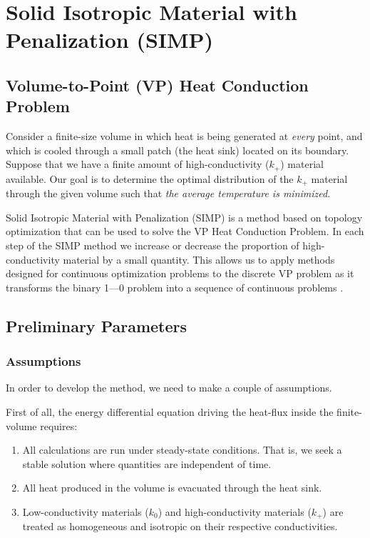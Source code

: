 \section{Solid Isotropic Material with Penalization (SIMP)}

\subsection*{Volume-to-Point (VP) Heat Conduction Problem}

Consider a finite-size volume in which heat is being generated at \textit{every} point, and which is cooled through a small patch (the heat sink) located on its boundary. Suppose that we have a finite amount of high-conductivity ($k_+$) material available. Our goal is to determine the optimal distribution of the $k_+$ material through the given volume such that \textit{the average temperature is minimized}.

Solid Isotropic Material with Penalization (SIMP) is a method based on topology optimization that can be used to solve the VP Heat Conduction Problem. In each step of the SIMP method we increase or decrease the proportion of high-conductivity material by a small quantity. This allows us to apply methods designed for continuous optimization problems to the discrete VP problem as it transforms the binary 1---0 problem into a sequence of continuous problems \cite{Marck2012}.

\subsection{Preliminary Parameters}

\subsubsection*{Assumptions}
In order to develop the method, we need to make a couple of assumptions.

First of all, the energy differential equation driving the heat-flux inside the finite-volume requires:
\begin{enumerate}
	\item All calculations are run under steady-state conditions. That is, we seek a stable solution where quantities are independent of time.
	\item All heat produced in the volume is evacuated through the heat sink.
	\item Low-conductivity materials ($k_0$) and high-conductivity materials ($k_+$) are treated as homogeneous and isotropic on their respective conductivities.
\end{enumerate}

